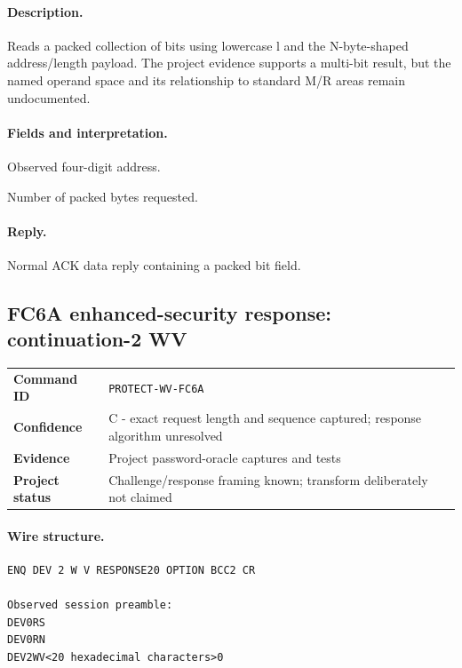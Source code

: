 \documentclass[10pt,letterpaper]{article}
\begin{document}
\paragraph{Description.} Reads a packed collection of bits using lowercase l and the N-byte-shaped address/length payload. The project evidence supports a multi-bit result, but the named operand space and its relationship to standard M/R areas remain undocumented.
\paragraph{Fields and interpretation.}
\begin{description}[style=nextline,leftmargin=3.2cm,labelwidth=3.0cm,font=\normalfont\bfseries]
\item[ADDR4] Observed four-digit address.
\item[LEN2] Number of packed bytes requested.
\end{description}
\paragraph{Reply.} Normal ACK data reply containing a packed bit field.

\subsection{FC6A enhanced-security response: continuation-2 WV}
\begin{tabularx}{\textwidth}{@{}>{\bfseries}p{2.8cm}X@{}}
Command ID & \texttt{PROTECT-WV-FC6A} \\
Confidence & C - exact request length and sequence captured; response algorithm unresolved \\
Evidence & Project password-oracle captures and tests \\
Project status & Challenge/response framing known; transform deliberately not claimed \\
\end{tabularx}
\vspace{0.35em}
\paragraph{Wire structure.}
\begin{Verbatim}[breaklines=true,breakanywhere=true,fontsize=\small]
ENQ DEV 2 W V RESPONSE20 OPTION BCC2 CR

Observed session preamble:
DEV0RS
DEV0RN
DEV2WV<20 hexadecimal characters>0
\end{Verbatim}
\end{document}
